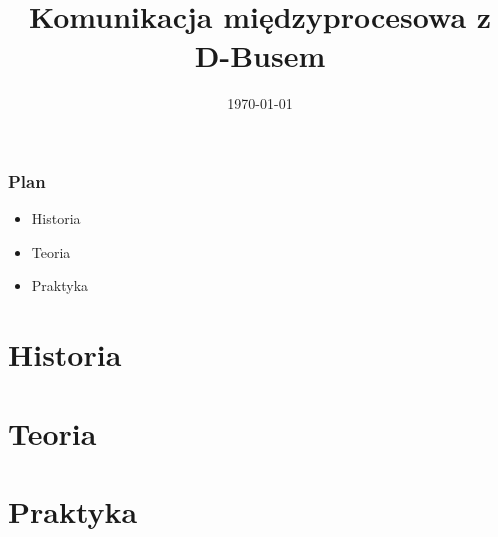\documentclass{beamer}
\begin{document}
\title{Komunikacja międzyprocesowa z D-Busem}   
\date{\today} 


\begin{frame}
    \titlepage
\end{frame} 

\begin{frame}
\frametitle{Plan}
\begin{itemize}
    \item Historia
    \item Teoria
    \item Praktyka
\end{itemize}
\end{frame}

\section{Historia}


\section{Teoria}


\section{Praktyka}



\end{document}

